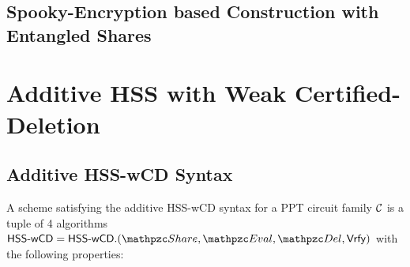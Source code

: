 \subsection{Spooky-Encryption based Construction with Entangled
Shares}

\section{Additive HSS with Weak Certified-Deletion}

\subsection{Additive HSS-wCD Syntax}

A scheme satisfying the additive HSS-wCD syntax for a PPT circuit
family $\mathcal{C}$ is a tuple of 4 algorithms $\HSSwcd = \HSSwcd.(\Sh,
\Ev, \Del, \Vrfy)$ with the following properties:

